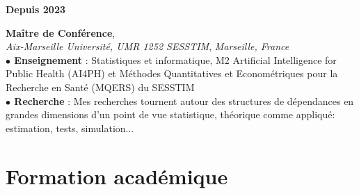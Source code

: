 \documentclass[a4paper,11pt]{article} %
\newcommand{\tabcv}[2]{
\begin{minipage}[t]{0.12\linewidth}
\textbf{\footnotesize #1}
\end{minipage}\hfill
\begin{minipage}[t]{0.85\linewidth}
#2
\end{minipage}
\vspace{1em}
}
\begin{document}
\begin{flushleft}
\tabcv{Depuis 2023}{
\textbf{Maître de Conférence}, \\ \textit{Aix-Marseille Université, UMR 1252 SESSTIM}, \textit{Marseille, France}\\[0.5em]
{\footnotesize
\textbf{$\bullet$ Enseignement} : Statistiques et informatique, M2 Artificial Intelligence for Public Health (AI4PH) et Méthodes Quantitatives et Econométriques pour la Recherche en Santé (MQERS) du SESSTIM\\
\textbf{$\bullet$ Recherche} : Mes recherches tournent autour des structures de dépendances en grandes dimensions d'un point de vue statistique, théorique comme appliqué: estimation, tests, simulation...
}
}

\section{Formation académique}\label{subsec:formation_academique}


\end{flushleft}
\end{document}
